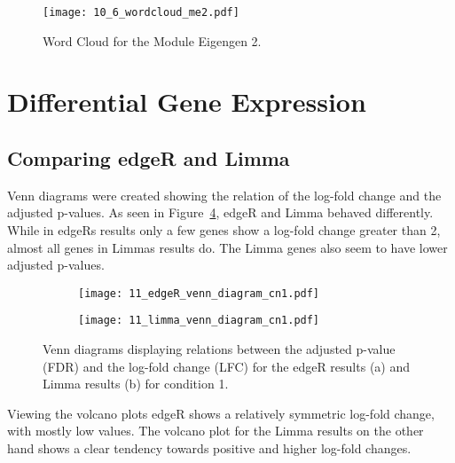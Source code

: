 \begin{figure}[H]
  \center
  \texttt{[image: 10\_6\_wordcloud\_me2.pdf]}
  \caption{Word Cloud for the Module Eigengen 2.}\label{fig:worcloud_wgcna}
\end{figure}

\section{Differential Gene Expression}

\subsection{Comparing edgeR and Limma}

Venn diagrams were created showing the relation of the log-fold change 
and the adjusted p-values. As seen in Figure~\ref{fig:venn}, 
edgeR and Limma behaved differently. While in edgeRs results only a few genes show a 
log-fold change greater than 2, almost all genes in Limmas results do. The Limma 
genes also seem to have lower adjusted p-values. 

\begin{figure}[H]
    \centering
    \begin{subfigure}[b]{0.45\textwidth} 
        \centering
        \texttt{[image: 11\_edgeR\_venn\_diagram\_cn1.pdf]} 
        \caption{}
        \label{fig:venn_edgeR_1}
    \end{subfigure}
    \hfill %
    \begin{subfigure}[b]{0.45\textwidth} %
        \centering
        \texttt{[image: 11\_limma\_venn\_diagram\_cn1.pdf]} %
        \caption{}
        \label{fig:venn_edgeR_2}
    \end{subfigure}
    \caption{Venn diagrams displaying relations between the adjusted p-value (FDR) and the log-fold 
    change (LFC) for the edgeR results (a) and Limma results (b) for condition 1.}
    \label{fig:venn}
\end{figure}

Viewing the volcano plots edgeR shows a relatively symmetric log-fold change, with mostly 
low values. The volcano plot for the Limma results on the other hand shows a clear tendency 
towards positive and higher log-fold changes.


